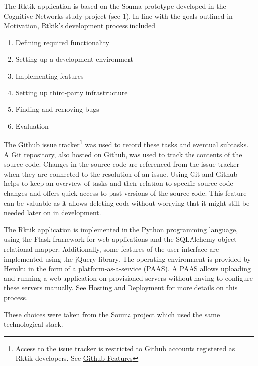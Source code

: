 
The Rktik application is based on the Souma prototype developed in the
Cognitive Networks study project (see 1). In line with the goals
outlined in \hyperref[motivation]{Motivation}, Rtkik's development
process included

\begin{enumerate}
\def\labelenumi{\arabic{enumi}.}
\tightlist
\item
  Defining required functionality
\item
  Setting up a development environment
\item
  Implementing features
\item
  Setting up third-party infrastructure
\item
  Finding and removing bugs
\item
  Evaluation
\end{enumerate}

The Github issue tracker\footnote{Access to the issue tracker is
  restricted to Github accounts registered as Rktik developers. See
  \href{https://github.com/features}{Github Features}} was used to
record these tasks and eventual subtasks. A Git repository, also hosted
on Github, was used to track the contents of the source code. Changes in
the source code are referenced from the issue tracker when they are
connected to the resolution of an issue. Using Git and Github helps to
keep an overview of tasks and their relation to specific source code
changes and offers quick access to past versions of the source code.
This feature can be valuable as it allows deleting code without worrying
that it might still be needed later on in development.

The Rktik application is implemented in the Python programming language,
using the Flask framework for web applications and the SQLAlchemy object
relational mapper. Additionally, some features of the user interface are
implemented using the jQuery library. The operating environment is
provided by Heroku in the form of a platform-as-a-service (PAAS). A PAAS
allows uploading and running a web application on provisioned servers
without having to configure these servers manually. See
\hyperref[hosting-and-deployment]{Hosting and Deployment} for more
details on this process.

These choices were taken from the Souma project which used the same
technological stack.

